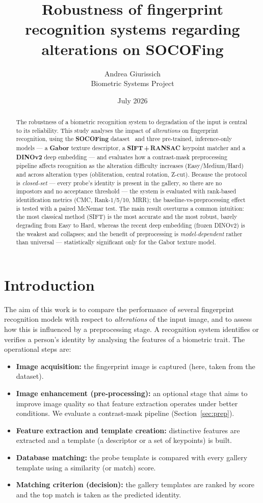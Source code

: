 \documentclass[11pt,a4paper]{article}
\title{\textbf{Robustness of fingerprint recognition systems regarding\\
alterations on SOCOFing}}
\author{Andrea Giurissich\\
\small Biometric Systems Project}
\date{July 2026}
\begin{document}
\maketitle

\begin{abstract}
\noindent
The robustness of a biometric recognition system to degradation of the input is
central to its reliability. This study analyses the impact of \emph{alterations}
on fingerprint recognition, using the \textbf{SOCOFing} dataset~\cite{socofing}
and three pre-trained, inference-only models --- a \textbf{Gabor} texture
descriptor, a \textbf{SIFT\,+\,RANSAC} keypoint matcher and a \textbf{DINOv2} deep
embedding --- and evaluates how a contrast-mask preprocessing pipeline affects
recognition as the alteration difficulty increases (Easy/Medium/Hard) and across
alteration types (obliteration, central rotation, Z-cut). Because the protocol is
\emph{closed-set} --- every probe's identity is present in the gallery, so there
are no impostors and no acceptance threshold --- the system is evaluated with
rank-based identification metrics (CMC, Rank-1/5/10, MRR); the
baseline-vs-preprocessing effect is tested with a paired McNemar test. The main
result overturns a common intuition: the most classical method (SIFT) is the most
accurate and the most robust, barely degrading from Easy to Hard, whereas the
recent deep embedding (frozen DINOv2) is the weakest and collapses; and the
benefit of preprocessing is \emph{model-dependent} rather than universal ---
statistically significant only for the Gabor texture model.
\end{abstract}

\section{Introduction}
The aim of this work is to compare the performance of several fingerprint
recognition models with respect to \emph{alterations} of the input image, and to
assess how this is influenced by a preprocessing stage. A recognition system
identifies or verifies a person's identity by analysing the features of a
biometric trait. The operational steps are:
\begin{itemize}
  \item \textbf{Image acquisition:} the fingerprint image is captured (here, taken
    from the dataset).
  \item \textbf{Image enhancement (pre-processing):} an optional stage that aims to
    improve image quality so that feature extraction operates under better
    conditions. We evaluate a contrast-mask pipeline (Section~\ref{sec:prep}).
  \item \textbf{Feature extraction and template creation:} distinctive features are
    extracted and a template (a descriptor or a set of keypoints) is built.
  \item \textbf{Database matching:} the probe template is compared with every
    gallery template using a similarity (or match) score.
  \item \textbf{Matching criterion (decision):} the gallery templates are ranked by
    score and the top match is taken as the predicted identity.
\end{itemize}
\end{document}
